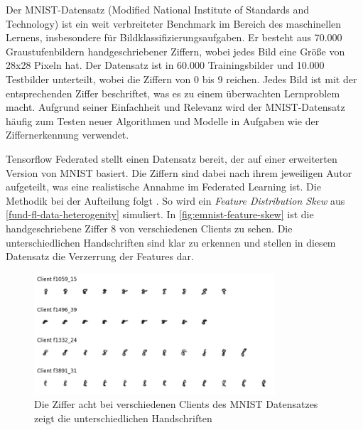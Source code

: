Der MNIST-Datensatz (Modified National Institute of Standards and Technology) ist ein weit verbreiteter Benchmark im Bereich des maschinellen Lernens, insbesondere für Bildklassifizierungsaufgaben. Er besteht aus 70.000 Graustufenbildern handgeschriebener Ziffern, wobei jedes Bild eine Größe von 28x28 Pixeln hat. Der Datensatz ist in 60.000 Trainingsbilder und 10.000 Testbilder unterteilt, wobei die Ziffern von 0 bis 9 reichen. Jedes Bild ist mit der entsprechenden Ziffer beschriftet, was es zu einem überwachten Lernproblem macht. Aufgrund seiner Einfachheit und Relevanz wird der MNIST-Datensatz häufig zum Testen neuer Algorithmen und Modelle in Aufgaben wie der Ziffernerkennung verwendet.

Tensorflow Federated stellt einen Datensatz bereit, der auf einer erweiterten Version von MNIST basiert. Die Ziffern sind dabei nach ihrem jeweiligen Autor aufgeteilt, was eine realistische Annahme im Federated Learning ist. Die Methodik bei der Aufteilung folgt \textcite{caldas:2018}. So wird ein \textit{Feature Distribution Skew} aus \autoref{fund-fl-data-heterogenity} simuliert. In \autoref{fig:emnist-feature-skew} ist die handgeschriebene Ziffer 8 von verschiedenen Clients zu sehen. Die unterschiedlichen Handschriften sind klar zu erkennen und stellen in diesem Datensatz die Verzerrung der Features dar.

\begin{figure}[tb]
	\centering
	\includegraphics[width=0.8\textwidth]{Bilder/emnist_feature_distribution_skew.png}
	\caption{Die Ziffer acht bei verschiedenen Clients des MNIST Datensatzes zeigt die unterschiedlichen Handschriften}
	\label{fig:emnist-feature-skew}
\end{figure}

